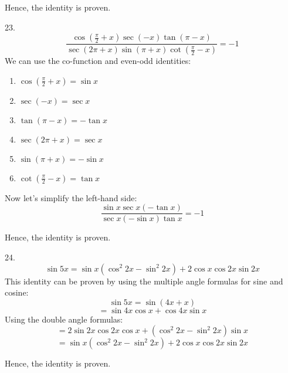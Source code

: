 \documentclass{article}
\begin{document}
    Hence, the identity is proven.

\vspace{2em}
23. $$\frac{\cos \left(\frac{\pi}{2} + x\right) \sec (-x) \tan (\pi - x)}{\sec (2\pi + x) \sin (\pi + x) \cot \left(\frac{\pi}{2} - x\right)} = -1$$
    We can use the co-function and even-odd identities:
\begin{enumerate}
    \item \(\cos \left(\frac{\pi}{2} + x\right) = \sin x\)
    \item \(\sec (-x) = \sec x\)
    \item \(\tan (\pi - x) = -\tan x\)
    \item \(\sec (2\pi + x) = \sec x\)
    \item \(\sin (\pi + x) = -\sin x\)
    \item \(\cot \left(\frac{\pi}{2} - x\right) = \tan x\)
\end{enumerate}
    Now let's simplify the left-hand side:
    \[\frac{\sin x \sec x (-\tan x)}{\sec x (-\sin x) \tan x} = -1\]

    Hence, the identity is proven.
    
\vspace{2em}
   24. $$\sin 5x = \sin x \left(\cos^2 2x - \sin^2 2x\right) + 2\cos x \cos 2x \sin 2x$$
    This identity can be proven by using the multiple angle formulas for sine and cosine:
    \[\sin 5x = \sin (4x + x)\]
    \[= \sin 4x \cos x + \cos 4x \sin x\]
    Using the double angle formulas:
    \[= 2\sin 2x \cos 2x \cos x + (\cos^2 2x - \sin^2 2x) \sin x\]
    \[= \sin x \left(\cos^2 2x - \sin^2 2x\right) + 2\cos x \cos 2x \sin 2x\]

    Hence, the identity is proven.
\end{document}
